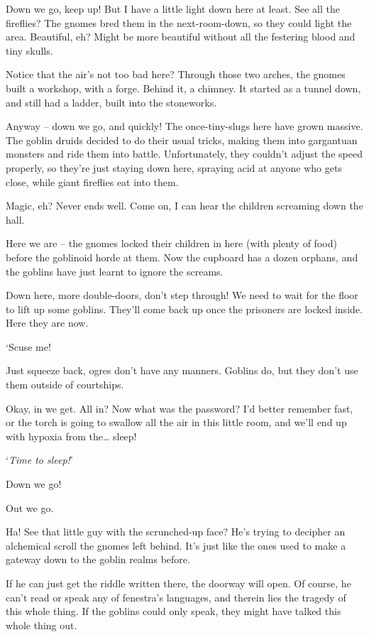 \begin{multicols}{2}
\begin{exampletext}
Down we go, keep up!
But I have a little light down here at least.
See all the fireflies?
The gnomes bred them in the next-room-down, so they could light the area.
Beautiful, eh?
Might be more beautiful without all the festering blood and tiny skulls.


Notice that the air's not too bad here?
Through those two arches, the gnomes built a workshop, with a forge.
Behind it, a chimney.
It started as a tunnel down, and still had a ladder, built into the stoneworks.

Anyway -- down we go, and quickly!
The once-tiny-slugs here have grown massive.
The goblin druids decided to do their usual tricks, making them into gargantuan monsters and ride them into battle.
Unfortunately, they couldn't adjust the speed properly, so they're just staying down here, spraying acid at anyone who gets close, while giant fireflies eat into them.

Magic, eh?
Never ends well.
Come on, I can hear the children screaming down the hall.

Here we are -- the gnomes locked their children in here (with plenty of food) before the goblinoid horde at them.
Now the cupboard has a dozen orphans, and the goblins have just learnt to ignore the screams.


Down here, more double-doors, don't step through!
We need to wait for the floor to lift up some goblins.
They'll come back up once the prisoners are locked inside.
Here they are now.

`Scuse me!

Just squeeze back, ogres don't have any manners.
Goblins do, but they don't use them outside of courtships.

Okay, in we get.
All in?
Now what was the password?
I'd better remember fast, or the torch is going to swallow all the air in this little room, and we'll end up with hypoxia from the\ldots
sleep!

`\textit{Time to sleep!}'

Down we go!

Out we go.

Ha!
See that little guy with the scrunched-up face?
He's trying to decipher an alchemical scroll the gnomes left behind.
It's just like the ones used to make a gateway down to the goblin realms before.

If he can just get the riddle written there, the doorway will open.
Of course, he can't read or speak any of \gls{fenestra}'s languages, and therein lies the tragedy of this whole thing.
If the goblins could only speak, they might have talked this whole thing out.


\end{exampletext}
\end{multicols}
